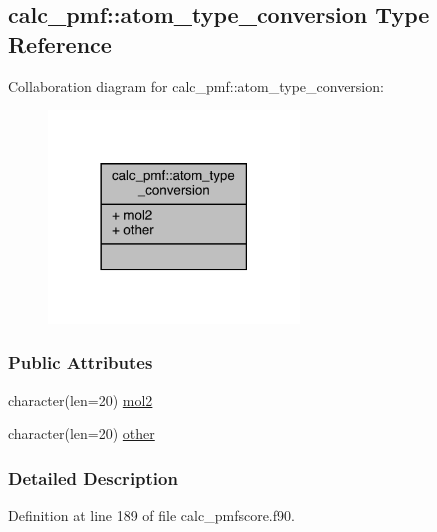 \hypertarget{structcalc__pmf_1_1atom__type__conversion}{\subsection{calc\-\_\-pmf\-:\-:atom\-\_\-type\-\_\-conversion Type Reference}
\label{structcalc__pmf_1_1atom__type__conversion}
}


Collaboration diagram for calc\-\_\-pmf\-:\-:atom\-\_\-type\-\_\-conversion\-:
\nopagebreak
\begin{figure}[H]
\begin{center}
\leavevmode
\includegraphics[width=189pt]{structcalc__pmf_1_1atom__type__conversion__coll__graph}
\end{center}
\end{figure}
\subsubsection*{Public Attributes}
\begin{DoxyCompactItemize}
\item 
character(len=20) \hyperlink{structcalc__pmf_1_1atom__type__conversion_a8ea7f721a74d5b33440e3ac1afe7c930}{mol2}
\item 
character(len=20) \hyperlink{structcalc__pmf_1_1atom__type__conversion_aece20142b8c627210697aaa139d1cac3}{other}
\end{DoxyCompactItemize}


\subsubsection{Detailed Description}


Definition at line 189 of file calc\-\_\-pmfscore.\-f90.



